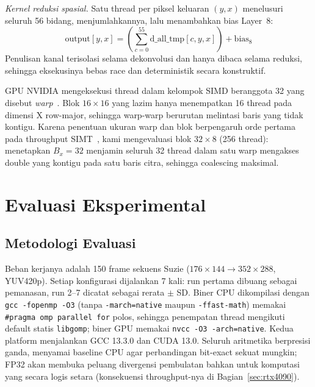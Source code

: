 \documentclass[conference]{IEEEtran}
\begin{document}
\emph{Kernel reduksi spasial.} Satu thread per piksel keluaran $(y,x)$ menelusuri seluruh 56 bidang, menjumlahkannya, lalu menambahkan bias Layer~8:
\begin{equation}
\text{output}[y, x] = \left( \sum_{c=0}^{55} \text{d\_all\_tmp}[c, y, x] \right) + \text{bias}_8
\end{equation}
Penulisan kanal terisolasi selama dekonvolusi dan hanya dibaca selama reduksi, sehingga eksekusinya bebas race dan deterministik secara konstruktif.

GPU NVIDIA mengeksekusi thread dalam kelompok SIMD beranggota 32 yang disebut \emph{warp}~\cite{nvidiacudaguide}. Blok $16{\times}16$ yang lazim hanya menempatkan 16 thread pada dimensi X row-major, sehingga warp-warp berurutan melintasi baris yang tidak kontigu. Karena penentuan ukuran warp dan blok berpengaruh orde pertama pada throughput SIMT~\cite{lashgar2012warpresize}, kami mengevaluasi blok $32{\times}8$ (256 thread): menetapkan $B_x=32$ menjamin seluruh 32 thread dalam satu warp mengakses double yang kontigu pada satu baris citra, sehingga coalescing maksimal.

\section{Evaluasi Eksperimental}

\subsection{Metodologi Evaluasi}
\label{sec:methodology}
Beban kerjanya adalah 150 frame sekuens Suzie ($176{\times}144 \rightarrow 352{\times}288$, YUV420p). Setiap konfigurasi dijalankan 7 kali: run pertama dibuang sebagai pemanasan, run 2--7 dicatat sebagai rerata $\pm$ SD. Biner CPU dikompilasi dengan \texttt{gcc -fopenmp -O3} (tanpa \texttt{-march=native} maupun \texttt{-ffast-math}) memakai \texttt{\#pragma omp parallel for} polos, sehingga penempatan thread mengikuti default statis \texttt{libgomp}; biner GPU memakai \texttt{nvcc -O3 -arch=native}. Kedua platform menjalankan GCC 13.3.0 dan CUDA 13.0. Seluruh aritmetika berpresisi ganda, menyamai baseline CPU agar perbandingan bit-exact sekuat mungkin; FP32 akan membuka peluang divergensi pembulatan bahkan untuk komputasi yang secara logis setara (konsekuensi throughput-nya di Bagian~\ref{sec:rtx4090}).
\end{document}
